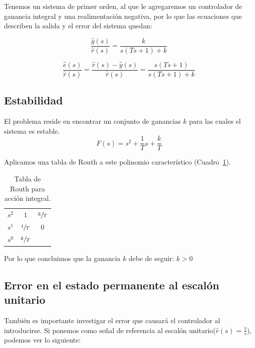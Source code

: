         Tenemos un sistema de primer orden, al que le agregaremos un controlador de ganancia integral y una realimentación negativa, por lo que las ecuaciones que describen la salida y el error del sistema quedan:

        \begin{equation}
            \frac{\hat{y}(s)}{\hat{r}(s)} = \frac{k}{s(Ts + 1) + k}
        \end{equation}

        \begin{equation}
            \frac{\hat{e}(s)}{\hat{r}(s)} = \frac{\hat{r}(s) - \hat{y}(s)}{\hat{r}(s)} = \frac{s(Ts + 1)}{s(Ts + 1) + k}
        \end{equation}


        \subsection{Estabilidad}
            El problema reside en encontrar un conjunto de ganancias $k$ para las cuales el sistema es estable.
            \begin{equation}
                F(s) = s^2 + \frac{1}{T} s + \frac{k}{T}
            \end{equation}

            Aplicamos una tabla de Routh a este polinomio característico (Cuadro~\ref{tab:AccionIntegral}).

            \begin{table}[htbp]
                \centering
                \begin{tabular}{c|c c}
                $s^2$ & $1$ & $\sfrac{k}{T}$ \\
                $s^1$ & $\sfrac{1}{T}$ & $0$ \\
                $s^0$ & $\sfrac{k}{T}$
                \end{tabular}
                \caption{\label{tab:AccionIntegral}Tabla de Routh para acción integral.}
            \end{table}

            Por lo que concluimos que la ganancia $k$ debe de seguir: $k>0$


        \subsection{Error en el estado permanente al escalón unitario}
            También es importante investigar el error que causará el controlador al introducirse. Si ponemos como señal de referencia al escalón unitario($\hat{r}(s) = \frac{1}{s}$), podemos ver lo siguiente:

